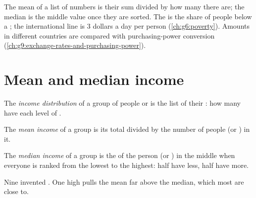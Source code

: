 \begin{recall}
The mean of a list of numbers is their sum divided by how many there are; the median is the middle value
once they are sorted. The  is the share of people below a ; the international line
is 3 dollars a day per person (\cref{ch:g6:poverty}). Amounts in different countries are compared with
purchasing-power conversion (\cref{ch:g9:exchange-rates-and-purchasing-power}).
\end{recall}

\section{Mean and median income}

\begin{definition}\label{def:g9:income-distribution:income-distribution}
The \emph{income distribution} of a group of people or  is the list
of their : how many have each level of .
\end{definition}

\begin{definition}\label{def:g9:income-distribution:mean-income}
The \emph{mean income} of a group is its total  divided by the number of people
(or ) in it.
\end{definition}

\begin{definition}\label{def:g9:income-distribution:median-income}
The \emph{median income} of a group is the  of the person (or ) in the
middle when everyone is ranked from the lowest  to the highest: half have less, half have more.
\end{definition}

\begin{omfigure}

{\small Nine invented . One high  pulls the mean far above the median, which most
 are close to.}
\end{omfigure}

